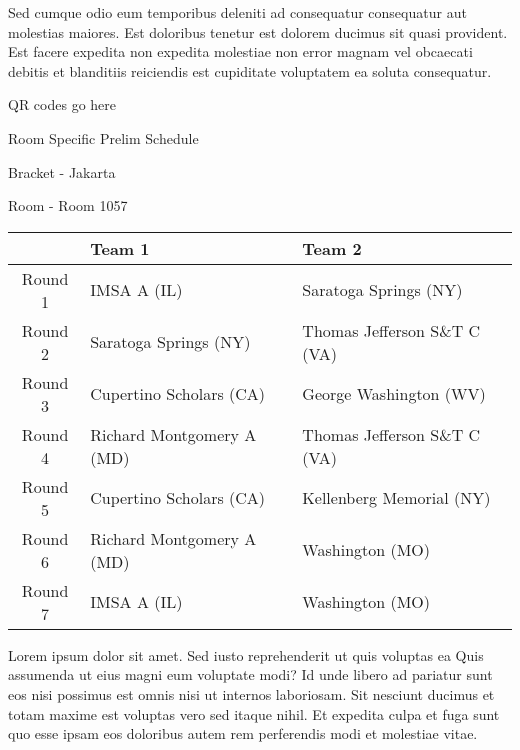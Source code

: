 \documentclass{article}%
\begin{document}
\newline%
Sed cumque odio eum temporibus deleniti ad consequatur consequatur aut molestias maiores. Est doloribus tenetur est dolorem ducimus sit quasi provident. Est facere expedita non expedita molestiae non error magnam vel obcaecati debitis et blanditiis reiciendis est cupiditate voluptatem ea soluta consequatur.%
\vspace*{140pt}%
\begin{center}%
\begin{Huge}%
QR codes go here%
\end{Huge}%
\end{center}%
\newpage%
\begin{center}%
\begin{Huge}%
Room Specific Prelim Schedule%
\end{Huge}%
\vspace*{8pt}%
\linebreak%
\begin{Large}%
Bracket {-} Jakarta%
\end{Large}%
\vspace*{8pt}%
\linebreak%
\vspace*{8pt}%
\begin{Large}%
Room {-} Room 1057%
\end{Large}%
\end{center}%
%
\begin{tabularx}{\textwidth}{|c|Y|Y|}%
\hline%
&Team 1&Team 2\\%
\hline%
Round 1&IMSA A (IL)&Saratoga Springs (NY)\\%
Round 2&Saratoga Springs (NY)&Thomas Jefferson S\&T C (VA)\\%
Round 3&Cupertino Scholars (CA)&George Washington (WV)\\%
Round 4&Richard Montgomery A (MD)&Thomas Jefferson S\&T C (VA)\\%
Round 5&Cupertino Scholars (CA)&Kellenberg Memorial (NY)\\%
Round 6&Richard Montgomery A (MD)&Washington (MO)\\%
Round 7&IMSA A (IL)&Washington (MO)\\%
\hline%
\end{tabularx}%
\vspace*{8pt}%
\newline%
Lorem ipsum dolor sit amet. Sed iusto reprehenderit ut quis voluptas ea Quis assumenda ut eius magni eum voluptate modi? Id unde libero ad pariatur sunt eos nisi possimus est omnis nisi ut internos laboriosam. Sit nesciunt ducimus et totam maxime est voluptas vero sed itaque nihil. Et expedita culpa et fuga sunt quo esse ipsam eos doloribus autem rem perferendis modi et molestiae vitae.\newline%
\end{document}
